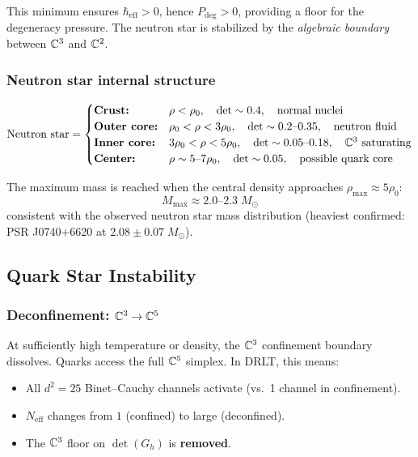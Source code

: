This minimum ensures $\hbar_\text{eff} > 0$, hence $P_\text{deg} > 0$, providing a floor for the degeneracy pressure. The neutron star is stabilized by the \emph{algebraic boundary} between $\mathbb{C}^3$ and $\mathbb{C}^2$.

\subsubsection{Neutron star internal structure}

\begin{equation}
\text{Neutron star} = \begin{cases}
\textbf{Crust:} & \rho < \rho_0, \quad \det \sim 0.4, \quad \text{normal nuclei} \\
\textbf{Outer core:} & \rho_0 < \rho < 3\rho_0, \quad \det \sim 0.2\text{--}0.35, \quad \text{neutron fluid} \\
\textbf{Inner core:} & 3\rho_0 < \rho < 5\rho_0, \quad \det \sim 0.05\text{--}0.18, \quad \text{$\mathbb{C}^3$ saturating} \\
\textbf{Center:} & \rho \sim 5\text{--}7\rho_0, \quad \det \sim 0.05, \quad \text{possible quark core}
\end{cases}
\end{equation}

The maximum mass is reached when the central density approaches $\rho_\text{max} \approx 5\rho_0$:
\begin{equation}
M_\text{max} \approx 2.0\text{--}2.3\;M_\odot
\end{equation}
consistent with the observed neutron star mass distribution (heaviest confirmed: PSR J0740+6620 at $2.08 \pm 0.07\;M_\odot$).

\subsection{Quark Star Instability}

\subsubsection{Deconfinement: $\mathbb{C}^3 \to \mathbb{C}^5$}

At sufficiently high temperature or density, the $\mathbb{C}^3$ confinement boundary dissolves. Quarks access the full $\mathbb{C}^5$ simplex. In DRLT, this means:
\begin{itemize}
\item All $d^2 = 25$ Binet--Cauchy channels activate (vs.\ 1 channel in confinement).
\item $N_\text{eff}$ changes from $1$ (confined) to large (deconfined).
\item The $\mathbb{C}^3$ floor on $\det(G_h)$ is \textbf{removed}.
\end{itemize}


